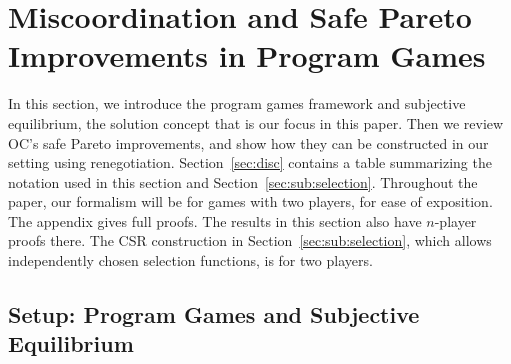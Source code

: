 \documentclass[sigconf]{aamas}
\theoremstyle{definition}
\begin{document}

 
\section{Miscoordination and Safe Pareto Improvements
in Program Games} 

In this section, we introduce
the program games framework and subjective
equilibrium, the solution concept that is
our focus in this paper. Then we review 
OC's
safe Pareto improvements, and show how they
can be constructed in our setting using 
renegotiation.
Section~\ref{sec:disc}
contains a table summarizing
the notation used in this section and Section~\ref{sec:sub:selection}. Throughout the paper, our formalism will be for games with two players, for ease of exposition.
The appendix gives full proofs. The results in this section also have
${n}$-player proofs there. The CSR construction in
Section~\ref{sec:sub:selection}, which allows independently chosen
selection functions, is for two players.

\subsection{Setup: Program Games and Subjective Equilibrium}
\label{sub:proggame}
\end{document}
